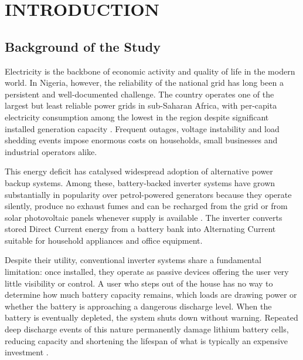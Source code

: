 \documentclass[12pt, a4paper]{report}
\begin{document}
\newpage
\setcounter{page}{6}
\tableofcontents

\newpage
\listoffigures

\newpage
\listoftables
\newpage
\renewcommand{\lstlistlistingname}{LIST OF LISTINGS}
\lstlistoflistings


\newpage
{}
\setcounter{page}{1}

\chapter{INTRODUCTION}

\section{Background of the Study}

Electricity is the backbone of economic activity and quality of life in
the modern world. In Nigeria, however, the reliability of the national
grid has long been a persistent and well-documented challenge. The country
operates one of the largest but least reliable power grids in sub-Saharan
Africa, with per-capita electricity consumption among the lowest in the
region despite significant installed generation capacity \citep{aliyu2013}.
Frequent outages, voltage instability and load shedding events impose
enormous costs on households, small businesses and industrial operators
alike.

This energy deficit has catalysed widespread adoption of alternative power
backup systems. Among these, battery-backed inverter systems have grown
substantially in popularity over petrol-powered generators because they
operate silently, produce no exhaust fumes and can be recharged from the
grid or from solar photovoltaic panels whenever supply is available
\citep{rashid2014}. The inverter converts stored Direct Current energy from
a battery bank into Alternating Current suitable for household appliances
and office equipment.

Despite their utility, conventional inverter systems share a fundamental
limitation: once installed, they operate as passive devices offering the
user very little visibility or control. A user who steps out of the house
has no way to determine how much battery capacity remains, which loads are
drawing power or whether the battery is approaching a dangerous discharge
level. When the battery is eventually depleted, the system shuts down
without warning. Repeated deep discharge events of this nature permanently
damage lithium battery cells, reducing capacity and shortening the
lifespan of what is typically an expensive investment \citep{omar2014}.
\end{document}
